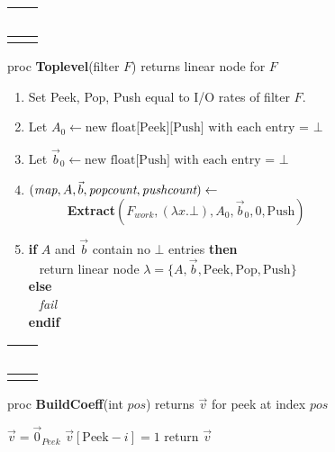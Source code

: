 \begin{algorithm}
\begin{tabular}{l}
~\hspace{3in}~ \\
\hline \\
\end{tabular}
proc {\bf Toplevel}(filter $F$) returns linear node for $F$
\begin{enumerate}
\item Set Peek, Pop, Push equal to I/O rates of filter $F$.
\item Let $A_{0} \leftarrow \mbox{new float[Peek][Push] with each entry =~} \bot$
\item Let ${\vec b_{0}} \leftarrow \mbox{new float[Push] with each entry =~} \bot$
\item $(\mbox{\it map}, A, {\vec b}, \mbox{\it popcount}, \mbox{\it pushcount}) \leftarrow$ \\
\verb+      +{\bf Extract}$(F_{work}, (\lambda x . \bot), A_{0}, {\vec b_{0}}, 0, \mbox{Push})$
\item {\bf if} $A$ and ${\vec b}$ contain no $\bot$ entries {\bf then} \\
\verb+ + return linear node $\lambda = \{A, {\vec b}, \mbox{Peek}, \mbox{Pop}, \mbox{Push}\}$ \\
 {\bf else} \\
\verb+ + {\it fail} \\
 {\bf endif}
\end{enumerate}
\begin{tabular}{l}
~\hspace{3in}~ \\
\hline \\
\end{tabular}
proc {\bf BuildCoeff}(int $pos$) returns $\vec v$ for peek at index $pos$ \\ \vspace{-12pt}
\begin{algorithmic}
\STATE $\vec v = \vec 0_{Peek}$
\STATE $\vec v[\mbox{Peek}-i] = 1$
\STATE return $\vec v$
\end{algorithmic}
\end{algorithm}


